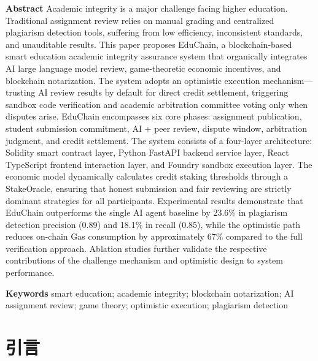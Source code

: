 \documentclass[10.5pt,compsoc]{CjC}
\begin{document}
\begin{center}
\parbox{0.92\textwidth}{
\setlength{\baselineskip}{13pt}
\noindent\textbf{Abstract}\quad
Academic integrity is a major challenge facing higher education. Traditional assignment review relies on manual grading and centralized plagiarism detection tools, suffering from low efficiency, inconsistent standards, and unauditable results. This paper proposes EduChain, a blockchain-based smart education academic integrity assurance system that organically integrates AI large language model review, game-theoretic economic incentives, and blockchain notarization. The system adopts an optimistic execution mechanism—trusting AI review results by default for direct credit settlement, triggering sandbox code verification and academic arbitration committee voting only when disputes arise. EduChain encompasses six core phases: assignment publication, student submission commitment, AI + peer review, dispute window, arbitration judgment, and credit settlement. The system consists of a four-layer architecture: Solidity smart contract layer, Python FastAPI backend service layer, React TypeScript frontend interaction layer, and Foundry sandbox execution layer. The economic model dynamically calculates credit staking thresholds through a StakeOracle, ensuring that honest submission and fair reviewing are strictly dominant strategies for all participants. Experimental results demonstrate that EduChain outperforms the single AI agent baseline by 23.6\% in plagiarism detection precision (0.89) and 18.1\% in recall (0.85), while the optimistic path reduces on-chain Gas consumption by approximately 67\% compared to the full verification approach. Ablation studies further validate the respective contributions of the challenge mechanism and optimistic design to system performance.
\vspace{1mm}

\noindent\textbf{Keywords}\quad
smart education; academic integrity; blockchain notarization; AI assignment review; game theory; optimistic execution; plagiarism detection
}
\end{center}
\vspace{2mm}

\twocolumn
{}

\section{引言}
\end{document}
